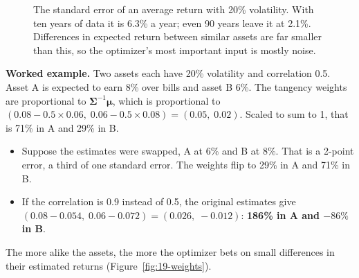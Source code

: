 \begin{figure}[htbp]
\centering
{}
\caption{The standard error of an average return with 20\% volatility. With ten years of data it is 6.3\% a year; even 90 years leave it at 2.1\%. Differences in expected return between similar assets are far smaller than this, so the optimizer's most important input is mostly noise.}
\label{fig:19-se}
\end{figure}

\textbf{Worked example.} Two assets each have 20\% volatility and correlation 0.5. Asset A is expected to earn 8\% over bills and asset B 6\%. The tangency weights are proportional to $\boldsymbol{\Sigma}^{-1}\boldsymbol{\mu}$, which is proportional to $(0.08 - 0.5 \times 0.06,\; 0.06 - 0.5 \times 0.08) = (0.05,\; 0.02)$. Scaled to sum to 1, that is 71\% in A and 29\% in B.

\begin{itemize}
  \item Suppose the estimates were swapped, A at 6\% and B at 8\%. That is a 2-point error, a third of one standard error. The weights flip to 29\% in A and 71\% in B.
  \item {\sloppy If the correlation is 0.9 instead of 0.5, the original estimates give $(0.08 - 0.054,\; 0.06 - 0.072) = (0.026,\; -0.012)$: \textbf{186\% in A and $-86\%$ in B}.\par}
\end{itemize}

The more alike the assets, the more the optimizer bets on small differences in their estimated returns (Figure~\ref{fig:19-weights}).

